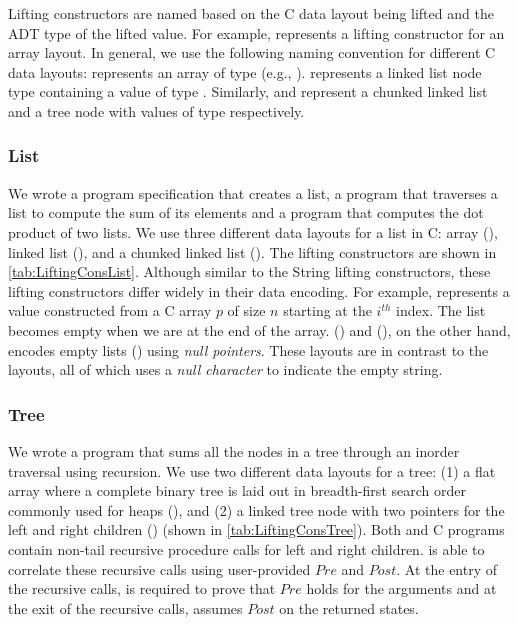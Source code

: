 Lifting constructors are named based on the C data layout being lifted
and the \SpecL{} ADT type of the lifted value.
For example,  represents a  lifting constructor
for an array layout.
In general, we use the following naming convention for different C data layouts:
 represents an array of type  (e.g., ).
 represents a linked list node type containing a value of type .
Similarly,  and  represent a chunked linked list and a tree node
with values of type  respectively.







\subsubsection{List}
We wrote a \SpecL{} program specification that creates a list, a
program that traverses a list to compute the sum of its elements and a program
that computes the dot product of two lists. We use three different
data layouts for a list in C: array (),
linked list (), and
a chunked linked list ().
The lifting constructors are shown in \cref{tab:LiftingConsList}.
Although similar to the String lifting constructors, these lifting
constructors differ widely in their data encoding. For example,
 represents a  value constructed
from a C array $p$ of size $n$ starting at the $i^{th}$ index. The list becomes empty
when we are at the end of the array. ()
and (), on the other hand, encodes empty
lists () using {\em null pointers}. These layouts are in contrast to the
 layouts, all of which uses a {\em null character} to
indicate the empty string.



\subsubsection{Tree}
We wrote a \SpecL{} program that sums all the nodes in a tree
through an inorder traversal using recursion. We use two different data layouts for a tree: 
(1) a flat array where a
complete binary tree is laid out in breadth-first search order commonly used for heaps (),
and (2) a linked tree node with two pointers for the left and right children () (shown in \cref{tab:LiftingConsTree}).
Both \SpecL{} and C programs contain non-tail recursive procedure calls for left and right children.
\toolName{} is able to correlate these recursive calls using user-provided $Pre$ and $Post$.
At the entry of the recursive calls, \toolName{} is required to prove that $Pre$ holds for the arguments
and at the exit of the recursive calls, \toolName{} assumes $Post$ on the returned states.

